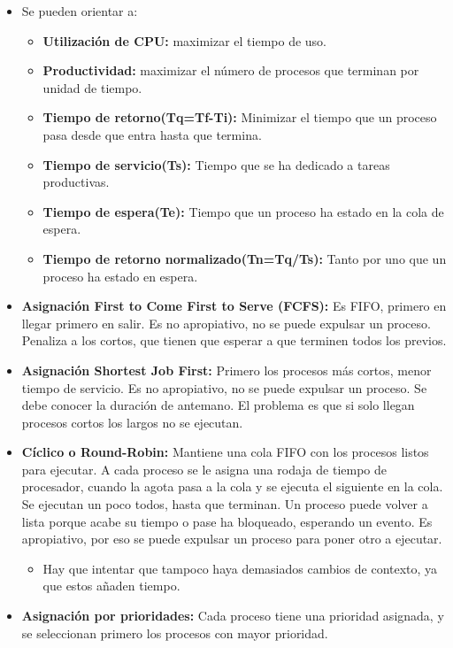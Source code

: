 \documentclass[12pt, twoside, openright]{report} %
\begin{document}
  \begin{itemize}
  \item Se pueden orientar a:
    

    \begin{itemize}
    \item \textbf{Utilización de CPU:} maximizar el tiempo de uso.
      
    \item \textbf{Productividad:} maximizar el número de procesos que
      terminan por unidad de tiempo.
      
    \item \textbf{Tiempo de retorno(Tq=Tf-Ti):} Minimizar el tiempo que un
      proceso pasa desde que entra hasta que termina.
      
    \item \textbf{Tiempo de servicio(Ts):} Tiempo que se ha dedicado a
      tareas productivas.
      
    \item \textbf{Tiempo de espera(Te):} Tiempo que un proceso ha estado en
      la cola de espera.
      
    \item \textbf{Tiempo de retorno normalizado(Tn=Tq/Ts):} Tanto por uno
      que un proceso ha estado en espera.
      
    \end{itemize}
  \item \textbf{Asignación First to Come First to Serve (FCFS):} Es FIFO,
    primero en llegar primero en salir. Es no apropiativo, no se puede
    expulsar un proceso. Penaliza a los cortos, que tienen que esperar a
    que terminen todos los previos.
    
  \item \textbf{Asignación Shortest Job First:} Primero los procesos más
    cortos, menor tiempo de servicio. Es no apropiativo, no se puede
    expulsar un proceso. Se debe conocer la duración de antemano. El
    problema es que si solo llegan procesos cortos los largos no se
    ejecutan.
    
  \item \textbf{Cíclico o Round-Robin:} Mantiene una cola FIFO con los
    procesos listos para ejecutar. A cada proceso se le asigna una
    rodaja de tiempo de procesador, cuando la agota pasa a la cola y se
    ejecuta el siguiente en la cola. Se ejecutan un poco todos, hasta
    que terminan. Un proceso puede volver a lista porque acabe su
    tiempo o pase ha bloqueado, esperando un evento. Es apropiativo, por
    eso se puede expulsar un proceso para poner otro a ejecutar.
    

    \begin{itemize}
    \item Hay que intentar que tampoco haya demasiados cambios de contexto,
      ya que estos añaden tiempo.
      
    \end{itemize}
  \item \textbf{Asignación por prioridades:} Cada proceso tiene una
    prioridad asignada, y se seleccionan primero los procesos con mayor
    prioridad.
    
  \end{itemize}
\end{document}
